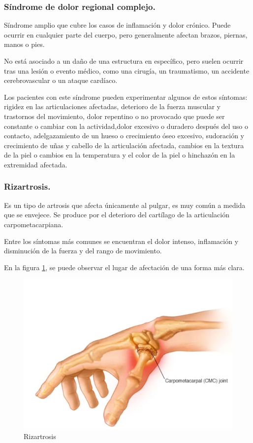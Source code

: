 \subsubsection{Síndrome de dolor regional complejo.}
Síndrome amplio que cubre los casos de inflamación y dolor crónico. Puede ocurrir en cualquier parte del cuerpo, pero generalmente afectan brazos, piernas, manos o pies. 

No está asociado a un daño de una estructura en específico, pero suelen ocurrir tras una lesión o evento médico, como una cirugía, un traumatismo, un accidente cerebrovascular o un ataque cardíaco. \cite{}

Los pacientes con este síndrome pueden experimentar algunos de estos síntomas: rigidez en las articulaciones afectadas, deterioro de la fuerza muscular y trastornos del movimiento, dolor repentino o no provocado que puede ser constante o cambiar con la actividad,dolor excesivo o duradero después del uso o contacto, adelgazamiento de un hueso o crecimiento óseo excesivo, sudoración y crecimiento de uñas y cabello de la articulación afectada, cambios en la textura de la piel o cambios en la temperatura y el color de la piel o hinchazón en la extremidad afectada.  \cite{}

\subsubsection{Rizartrosis.}
Es un tipo de artrosis que afecta únicamente al pulgar, es muy común a medida que se envejece. Se produce por el deterioro del cartílago de la articulación carpometacarpiana.

Entre los síntomas más comunes se encuentran el dolor intenso, inflamación y disminución de la fuerza y del rango de movimiento.

En la figura \ref{fig: Rizartrosis}, se puede observar el lugar de afectación de una forma más clara.

\begin{figure}
    \centering
    \includegraphics[width=0.5\linewidth]{img/Rizartrosis.png}
    \caption{Rizartrosis}
    \label{fig: Rizartrosis}
\end{figure}
